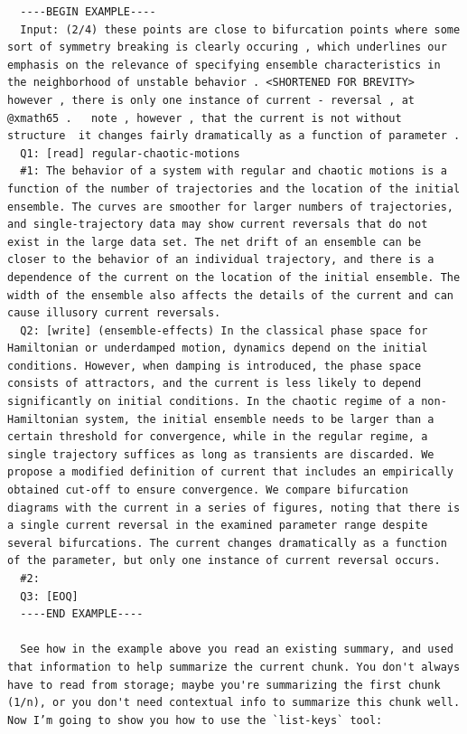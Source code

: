 \documentclass{article}
\begin{document}
\begin{lstlisting}
  ----BEGIN EXAMPLE----
  Input: (2/4) these points are close to bifurcation points where some sort of symmetry breaking is clearly occuring , which underlines our emphasis on the relevance of specifying ensemble characteristics in the neighborhood of unstable behavior . <SHORTENED FOR BREVITY> however , there is only one instance of current - reversal , at @xmath65 .   note , however , that the current is not without structure  it changes fairly dramatically as a function of parameter .
  Q1: [read] regular-chaotic-motions
  #1: The behavior of a system with regular and chaotic motions is a function of the number of trajectories and the location of the initial ensemble. The curves are smoother for larger numbers of trajectories, and single-trajectory data may show current reversals that do not exist in the large data set. The net drift of an ensemble can be closer to the behavior of an individual trajectory, and there is a dependence of the current on the location of the initial ensemble. The width of the ensemble also affects the details of the current and can cause illusory current reversals.
  Q2: [write] (ensemble-effects) In the classical phase space for Hamiltonian or underdamped motion, dynamics depend on the initial conditions. However, when damping is introduced, the phase space consists of attractors, and the current is less likely to depend significantly on initial conditions. In the chaotic regime of a non-Hamiltonian system, the initial ensemble needs to be larger than a certain threshold for convergence, while in the regular regime, a single trajectory suffices as long as transients are discarded. We propose a modified definition of current that includes an empirically obtained cut-off to ensure convergence. We compare bifurcation diagrams with the current in a series of figures, noting that there is a single current reversal in the examined parameter range despite several bifurcations. The current changes dramatically as a function of the parameter, but only one instance of current reversal occurs.
  #2:
  Q3: [EOQ]
  ----END EXAMPLE----

  See how in the example above you read an existing summary, and used that information to help summarize the current chunk. You don't always have to read from storage; maybe you're summarizing the first chunk (1/n), or you don't need contextual info to summarize this chunk well. Now I’m going to show you how to use the `list-keys` tool:


\end{lstlisting}
\end{document}
